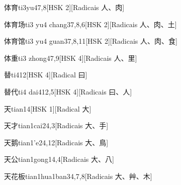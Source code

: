 \begin{entry}{体育}{ti3yu4}{7,8}[HSK 2][Radicais ⼈、⾁]
\end{entry}

\begin{entry}{体育场}{ti3 yu4 chang3}{7,8,6}[HSK 2][Radicais ⼈、⾁、⼟]
\end{entry}

\begin{entry}{体育馆}{ti3 yu4 guan3}{7,8,11}[HSK 2][Radicais ⼈、⾁、⾷]
\end{entry}

\begin{entry}{体重}{ti3 zhong4}{7,9}[HSK 4][Radicais ⼈、⾥]
\end{entry}

\begin{entry}{替}{ti4}{12}[HSK 4][Radical ⽈]
\end{entry}

\begin{entry}{替代}{ti4 dai4}{12,5}[HSK 4][Radicais ⽈、⼈]
\end{entry}

\begin{entry}{天}{tian1}{4}[HSK 1][Radical ⼤]
\end{entry}

\begin{entry}{天才}{tian1cai2}{4,3}[Radicais ⼤、⼿]
\end{entry}

\begin{entry}{天鹅}{tian1'e2}{4,12}[Radicais ⼤、⿃]
\end{entry}

\begin{entry}{天公}{tian1gong1}{4,4}[Radicais ⼤、⼋]
\end{entry}

\begin{entry}{天花板}{tian1hua1ban3}{4,7,8}[Radicais ⼤、⾋、⽊]
\end{entry}

